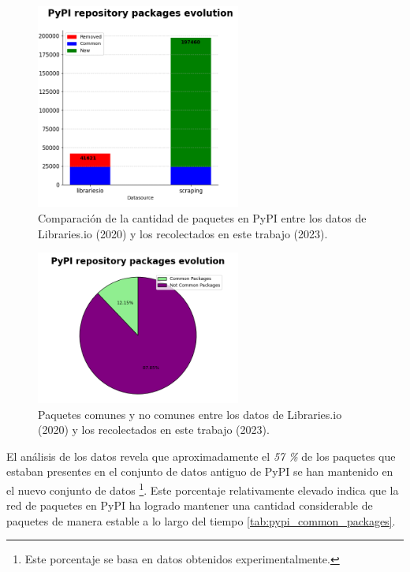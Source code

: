 \begin{figure}[ht!]
    \begin{center}
        \includegraphics[width=0.6\textwidth]{img/pypi/bar_common_packages.png}
        \caption{Comparación de la cantidad de paquetes en PyPI entre los datos de Libraries.io (2020) y los recolectados en este trabajo (2023).}
        \label{fig:pipy_common_packages_bar}
    \end{center}
\end{figure}

\begin{figure}[ht!]
    \begin{center}
        \includegraphics[width=0.6\textwidth]{img/pypi/circ_common_packages.png}
        \caption{Paquetes comunes y no comunes entre los datos de Libraries.io (2020) y los recolectados en este trabajo (2023).}
        \label{fig:pipy_common_packages_circle}
    \end{center}
\end{figure}

El análisis de los datos revela que aproximadamente el \textit{57 \%} de los paquetes que estaban
presentes en el conjunto de datos antiguo de PyPI se han mantenido en el nuevo conjunto de datos
\footnote{Este porcentaje se basa en datos obtenidos experimentalmente.}. Este porcentaje
relativamente elevado indica que la red de paquetes en PyPI ha logrado mantener una cantidad considerable
de paquetes de manera estable a lo largo del tiempo \ref{tab:pypi_common_packages}.


